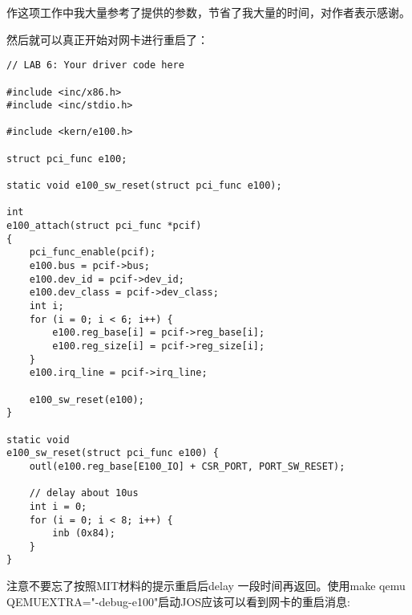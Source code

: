 \documentclass{article}
\begin{document}
\begin{CJK*}{UTF8}{gkai}
作这项工作中我大量参考了提供的参数，节省了我大量的时间，对作者表示感谢。


然后就可以真正开始对网卡进行重启了：


\begin{lstlisting}[style=ccode, title={\scriptsize \ttfamily \bfseries kern/e100.c}]
// LAB 6: Your driver code here

#include <inc/x86.h>
#include <inc/stdio.h>

#include <kern/e100.h>

struct pci_func e100;

static void e100_sw_reset(struct pci_func e100);

int 
e100_attach(struct pci_func *pcif) 
{
    pci_func_enable(pcif);
    e100.bus = pcif->bus;
    e100.dev_id = pcif->dev_id;
    e100.dev_class = pcif->dev_class;
    int i;
    for (i = 0; i < 6; i++) {
    	e100.reg_base[i] = pcif->reg_base[i];
        e100.reg_size[i] = pcif->reg_size[i];
    }
    e100.irq_line = pcif->irq_line;

    e100_sw_reset(e100);
}

static void
e100_sw_reset(struct pci_func e100) {
    outl(e100.reg_base[E100_IO] + CSR_PORT, PORT_SW_RESET);

    // delay about 10us
    int i = 0;
    for (i = 0; i < 8; i++) {
        inb (0x84);
    }
}

\end{lstlisting}

注意不要忘了按照MIT材料的提示重启后delay 一段时间再返回。使用make qemu QEMUEXTRA="-debug-e100"启动JOS应该可以看到网卡的重启消息:


\end{CJK*}
\end{document}

